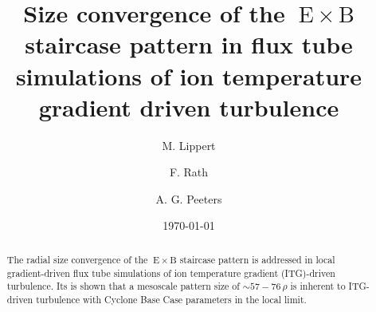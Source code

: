 \documentclass[aip, amsmath, amssymb, reprint, twocolumn, floatfix]{revtex4-1}
\newcommand{\exb}{\mathrm{\:E}\times\mathrm{B}}
\newcommand{\rhoth}{\rho}
\begin{document}

\title[Size convergence of the $\exb$ staircase pattern in flux tube simulations of ion temperature gradient driven turbulence]
{Size convergence of the $\exb$ staircase pattern in flux tube simulations of ion temperature gradient driven turbulence}

\author{M. Lippert}
\author{F. Rath}
\author{A. G. Peeters}

\date{\today}


\begin{abstract}
    The radial size convergence of the $\exb$ staircase pattern is addressed in local gradient-driven flux tube simulations of ion temperature gradient (ITG)-driven turbulence.
    Its is shown that a mesoscale pattern size of \linebreak $\sim 57-76\,\rhoth$ is inherent to ITG-driven turbulence with Cyclone Base Case parameters in the local limit. 
    
\end{abstract}
\maketitle

\end{document}
